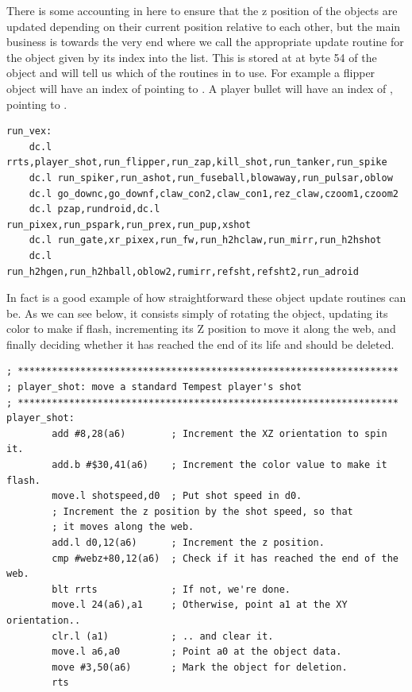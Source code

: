 There is some accounting in here to ensure that the z position of the objects are updated
depending on their current position relative to each other, but the main business is towards
the very end where we call the appropriate update routine for the object given by its index
into the  list. This is stored at at byte 54 of the object and will tell
us which of the routines in  to use. For example a flipper object will
have an index of  pointing to . A player bullet will have an
index of , pointing to .

\begin{lstlisting}
run_vex:
    dc.l rrts,player_shot,run_flipper,run_zap,kill_shot,run_tanker,run_spike
    dc.l run_spiker,run_ashot,run_fuseball,blowaway,run_pulsar,oblow
    dc.l go_downc,go_downf,claw_con2,claw_con1,rez_claw,czoom1,czoom2
    dc.l pzap,rundroid,dc.l run_pixex,run_pspark,run_prex,run_pup,xshot
    dc.l run_gate,xr_pixex,run_fw,run_h2hclaw,run_mirr,run_h2hshot
    dc.l run_h2hgen,run_h2hball,oblow2,rumirr,refsht,refsht2,run_adroid
\end{lstlisting}

In fact  is a good example of how straightforward these
object update routines can be. As we can see below, it consists simply of
rotating the object, updating its color to make if flash, incrementing its
Z position to move it along the web, and finally deciding whether it has
reached the end of its life and should be deleted.

\begin{lstlisting}
; *******************************************************************
; player_shot: move a standard Tempest player's shot
; *******************************************************************
player_shot:
        add #8,28(a6)        ; Increment the XZ orientation to spin it.
        add.b #$30,41(a6)    ; Increment the color value to make it flash.
        move.l shotspeed,d0  ; Put shot speed in d0.
        ; Increment the z position by the shot speed, so that
        ; it moves along the web.
        add.l d0,12(a6)      ; Increment the z position.
        cmp #webz+80,12(a6)  ; Check if it has reached the end of the web.
        blt rrts             ; If not, we're done.
        move.l 24(a6),a1     ; Otherwise, point a1 at the XY orientation..
        clr.l (a1)           ; .. and clear it.
        move.l a6,a0         ; Point a0 at the object data.
        move #3,50(a6)       ; Mark the object for deletion.
        rts
\end{lstlisting}
